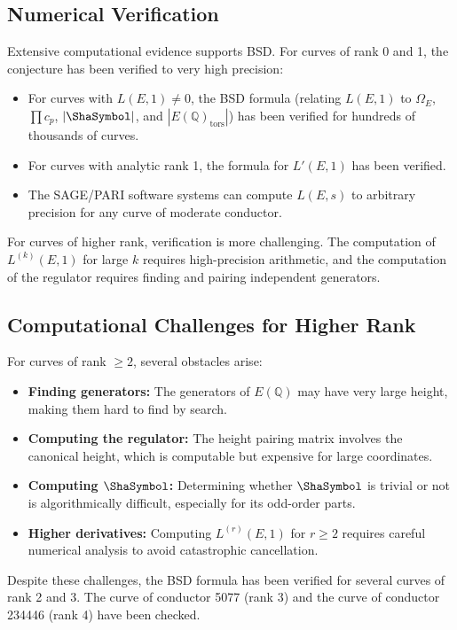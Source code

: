 \subsection{Numerical Verification}

Extensive computational evidence supports BSD. For curves of rank 0 and 1, the conjecture has been verified to very high precision:

\begin{itemize}
\item For curves with $L(E, 1) \neq 0$, the BSD formula (relating $L(E, 1)$ to $\Omega_E$, $\prod c_p$, $|\Sha|$, and $|E(\mathbb{Q})_{\mathrm{tors}}|$) has been verified for hundreds of thousands of curves.
\item For curves with analytic rank 1, the formula for $L'(E, 1)$ has been verified.
\item The SAGE/PARI software systems can compute $L(E, s)$ to arbitrary precision for any curve of moderate conductor.
\end{itemize}

For curves of higher rank, verification is more challenging. The computation of $L^{(k)}(E, 1)$ for large $k$ requires high-precision arithmetic, and the computation of the regulator requires finding and pairing independent generators.

\subsection{Computational Challenges for Higher Rank}

For curves of rank $\ge 2$, several obstacles arise:
\begin{itemize}
\item \textbf{Finding generators:} The generators of $E(\mathbb{Q})$ may have very large height, making them hard to find by search.
\item \textbf{Computing the regulator:} The height pairing matrix involves the canonical height, which is computable but expensive for large coordinates.
\item \textbf{Computing $\Sha$:} Determining whether $\Sha$ is trivial or not is algorithmically difficult, especially for its odd-order parts.
\item \textbf{Higher derivatives:} Computing $L^{(r)}(E, 1)$ for $r \ge 2$ requires careful numerical analysis to avoid catastrophic cancellation.
\end{itemize}

Despite these challenges, the BSD formula has been verified for several curves of rank 2 and 3. The curve of conductor 5077 (rank 3) and the curve of conductor 234446 (rank 4) have been checked.

